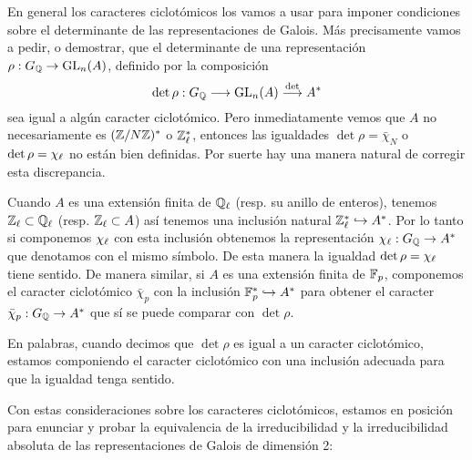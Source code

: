 \begin{nota}
  En general los caracteres ciclot\'omicos los vamos a usar para imponer condiciones sobre el determinante de las representaciones de Galois. M\'as precisamente vamos a pedir, o demostrar, que el determinante de una representaci\'on $\rho:G_{\mathbb{Q}}\rightarrow\mathrm{GL}_n(A)$, definido por la composici\'on
  \[
    \det\rho:G_{\mathbb{Q}}\longrightarrow\mathrm{GL}_n(A)\overset{\det}{\longrightarrow}A^*
  \]
  sea igual a alg\'un caracter ciclot\'omico. Pero inmediatamente vemos que $A$ no necesariamente es $(\mathbb{Z}/N\mathbb{Z})^*$ o $\mathbb{Z}_\ell^*$, entonces las igualdades $\det\rho=\bar{\chi}_N$ o $\det\rho=\chi_\ell$ no est\'an bien definidas. Por suerte hay una manera natural de corregir esta discrepancia.

  Cuando $A$ es una extensi\'on finita de $\mathbb{Q}_\ell$ (resp. su anillo de enteros), tenemos $\mathbb{Z}_\ell\subset\mathbb{Q}_\ell$ (resp. $\mathbb{Z}_\ell\subset A$)  as\'i tenemos una inclusi\'on natural $\mathbb{Z}_\ell^*\hookrightarrow A^*$. Por lo tanto si componemos $\chi_\ell$ con esta inclusi\'on obtenemos la representaci\'on $\chi_\ell:G_{\mathbb{Q}}\rightarrow A^*$ que denotamos con el mismo s\'imbolo. De esta manera la igualdad $\det\rho=\chi_\ell$ tiene sentido.
  De manera similar, si $A$ es una extensi\'on finita de $\mathbb{F}_p$, componemos el caracter ciclot\'omico $\bar{\chi}_p$ con la inclusi\'on $\mathbb{F}_p^*\hookrightarrow A^*$ para obtener el caracter $\bar{\chi}_p:G_{\mathbb{Q}}\rightarrow A^*$ que s\'i se puede comparar con $\det\rho$.
  
  En palabras, cuando decimos que $\det\rho$ es igual a un caracter ciclot\'omico, estamos componiendo el caracter ciclot\'omico con una inclusi\'on adecuada para que la igualdad tenga sentido.
\end{nota}

Con estas consideraciones sobre los caracteres ciclot\'omicos, estamos en posici\'on para enunciar y probar la equivalencia de la irreducibilidad y la irreducibilidad absoluta de las representaciones de Galois de dimensi\'on 2:

